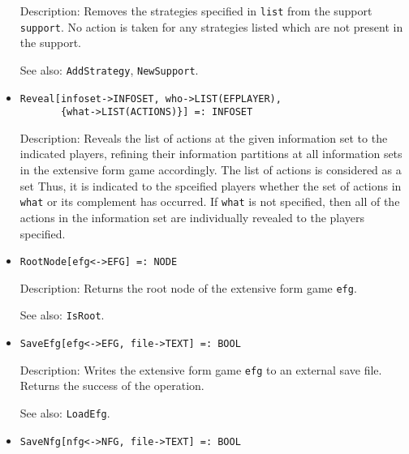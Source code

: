 \begin{itemize}
\bd
\item
[Description:] Removes the strategies specified in \verb+list+ from the
support \verb+support+.  No action is taken for any strategies listed
which are not present in the support.
\item
[See also:] {\tt AddStrategy}, {\tt NewSupport}.
\ed

\item
\protect \large \begin{verbatim}
Reveal[infoset->INFOSET, who->LIST(EFPLAYER), 
       {what->LIST(ACTIONS)}] =: INFOSET
\end{verbatim}\normalsize

\bd
\item
[Description:] Reveals the list of actions at the given information
set to the indicated players, refining their information partitions at
all information sets in the extensive form game accordingly.  The list
of actions is considered as a set Thus, it is indicated to the
spceified players whether the set of actions in \verb+what+ or its
complement has occurred.  If \verb+what+ is not specified, then all of
the actions in the information set are individually revealed to
the players specified.  
\ed


\item
\protect \large \begin{verbatim}
RootNode[efg<->EFG] =: NODE
\end{verbatim}\normalsize

\bd
\item
[Description:] Returns the root node of the extensive form game \verb+efg+.
\item
[See also:] {\tt IsRoot}.
\ed


\item
\protect \large \begin{verbatim}
SaveEfg[efg<->EFG, file->TEXT] =: BOOL
\end{verbatim}\normalsize

\bd
\item
[Description:] Writes the extensive form game \verb+efg+ to an external
save file.  Returns the success of the operation.
\item
[See also:] {\tt LoadEfg}.
\ed

\item
\protect \large \begin{verbatim}
SaveNfg[nfg<->NFG, file->TEXT] =: BOOL
\end{verbatim}\normalsize


\end{itemize}
